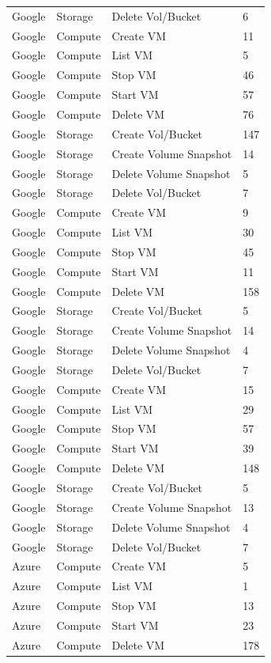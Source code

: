 \begin{table}[htb]
\begin{tabular} {p{3cm}|p{3cm}|p{5cm}|p{3cm}}
Google & Storage & Delete Vol/Bucket & 6  \\
Google & Compute & Create VM & 11  \\
Google & Compute & List VM & 5  \\
Google & Compute & Stop VM & 46  \\
Google & Compute & Start VM & 57  \\
Google & Compute & Delete VM & 76  \\
Google & Storage & Create Vol/Bucket & 147  \\
Google & Storage & Create Volume Snapshot & 14  \\
Google & Storage & Delete Volume Snapshot & 5  \\
Google & Storage & Delete Vol/Bucket & 7  \\
Google & Compute & Create VM & 9  \\
Google & Compute & List VM & 30  \\
Google & Compute & Stop VM & 45  \\
Google & Compute & Start VM & 11  \\
Google & Compute & Delete VM & 158  \\
Google & Storage & Create Vol/Bucket & 5  \\
Google & Storage & Create Volume Snapshot & 14  \\
Google & Storage & Delete Volume Snapshot & 4  \\
Google & Storage & Delete Vol/Bucket & 7  \\
Google & Compute & Create VM & 15  \\
Google & Compute & List VM & 29  \\
Google & Compute & Stop VM & 57  \\
Google & Compute & Start VM & 39  \\
Google & Compute & Delete VM & 148  \\
Google & Storage & Create Vol/Bucket & 5  \\
Google & Storage & Create Volume Snapshot & 13  \\
Google & Storage & Delete Volume Snapshot & 4  \\
Google & Storage & Delete Vol/Bucket & 7  \\
Azure & Compute & Create VM & 5  \\
Azure & Compute & List VM & 1  \\
Azure & Compute & Stop VM & 13  \\
Azure & Compute & Start VM & 23  \\
Azure & Compute & Delete VM & 178  \\

\end{tabular}
\end{table}
